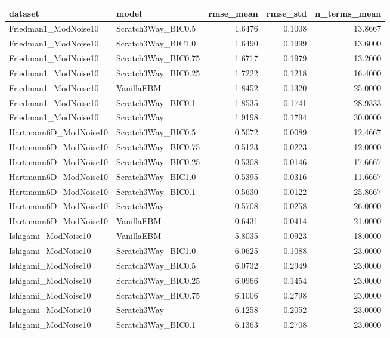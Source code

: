 \begin{tabular}{llrrr}
\toprule
dataset & model & rmse_mean & rmse_std & n_terms_mean \\
\midrule
Friedman1_ModNoise10 & Scratch3Way_BIC0.5 & 1.6476 & 0.1008 & 13.8667 \\
Friedman1_ModNoise10 & Scratch3Way_BIC1.0 & 1.6490 & 0.1999 & 13.6000 \\
Friedman1_ModNoise10 & Scratch3Way_BIC0.75 & 1.6717 & 0.1979 & 13.2000 \\
Friedman1_ModNoise10 & Scratch3Way_BIC0.25 & 1.7222 & 0.1218 & 16.4000 \\
Friedman1_ModNoise10 & VanillaEBM & 1.8452 & 0.1320 & 25.0000 \\
Friedman1_ModNoise10 & Scratch3Way_BIC0.1 & 1.8535 & 0.1741 & 28.9333 \\
Friedman1_ModNoise10 & Scratch3Way & 1.9198 & 0.1794 & 30.0000 \\
Hartmann6D_ModNoise10 & Scratch3Way_BIC0.5 & 0.5072 & 0.0089 & 12.4667 \\
Hartmann6D_ModNoise10 & Scratch3Way_BIC0.75 & 0.5123 & 0.0223 & 12.0000 \\
Hartmann6D_ModNoise10 & Scratch3Way_BIC0.25 & 0.5308 & 0.0146 & 17.6667 \\
Hartmann6D_ModNoise10 & Scratch3Way_BIC1.0 & 0.5395 & 0.0316 & 11.6667 \\
Hartmann6D_ModNoise10 & Scratch3Way_BIC0.1 & 0.5630 & 0.0122 & 25.8667 \\
Hartmann6D_ModNoise10 & Scratch3Way & 0.5708 & 0.0258 & 26.0000 \\
Hartmann6D_ModNoise10 & VanillaEBM & 0.6431 & 0.0414 & 21.0000 \\
Ishigami_ModNoise10 & VanillaEBM & 5.8035 & 0.0923 & 18.0000 \\
Ishigami_ModNoise10 & Scratch3Way_BIC1.0 & 6.0625 & 0.1088 & 23.0000 \\
Ishigami_ModNoise10 & Scratch3Way_BIC0.5 & 6.0732 & 0.2949 & 23.0000 \\
Ishigami_ModNoise10 & Scratch3Way_BIC0.25 & 6.0966 & 0.1454 & 23.0000 \\
Ishigami_ModNoise10 & Scratch3Way_BIC0.75 & 6.1006 & 0.2798 & 23.0000 \\
Ishigami_ModNoise10 & Scratch3Way & 6.1258 & 0.2052 & 23.0000 \\
Ishigami_ModNoise10 & Scratch3Way_BIC0.1 & 6.1363 & 0.2708 & 23.0000 \\
\bottomrule
\end{tabular}
